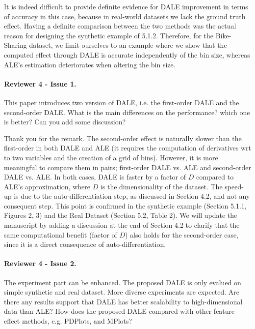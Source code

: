 \documentclass{article}
\begin{document}
It is indeed difficult to provide definite evidence for DALE improvement in terms of accuracy in this case, because in real-world datasets we lack the ground truth effect. Having a definite comparison between the two methods was the actual reason for designing the synthetic example of 5.1.2. Therefore, for the Bike-Sharing dataset, we limit ourselves to an example where we show that the computed effect through DALE is accurate independently of the bin size, whereas ALE's estimation deteriorates when altering the bin size.

\paragraph{Reviewer 4 - Issue 1.}

This paper introduces two version of DALE, i.e. the first-order DALE and the second-order DALE. What is the main differences on the performance? which one is better? Can you add some discussion?


Thank you for the remark. The second-order effect is naturally slower than the first-order in both DALE and ALE (it requires the computation of derivatives wrt to two variables and the creation of a grid of bins). However, it is more meaningful to compare them in pairs; first-order DALE vs. ALE and second-order DALE vs. ALE. In both cases, DALE is faster by a factor of \(D\) compared to ALE's approximation, where \(D\) is the dimensionality of the dataset. The speed-up is due to the auto-differentiation step, as discussed in Section 4.2, and not any consequent step. This point is confirmed in the synthetic example (Section 5.1.1, Figures 2, 3) and the Real Dataset (Section 5.2, Table 2). We will update the manuscript by adding a discussion at the end of Section 4.2 to clarify that the same computational benefit (factor of \(D\)) also holds for the second-order case, since it is a direct consequence of auto-differentiation.

\paragraph{Reviewer 4 - Issue 2.} The experiment part can be enhanced. The proposed DALE is only evalued on simple synthetic and real dataset. More diverse experiments are expected. Are there any results support that DALE has better scalability to high-dimensional data than ALE? How does the proposed DALE compared with other feature effect methods, e.g. PDPlots, and MPlots?
\end{document}
